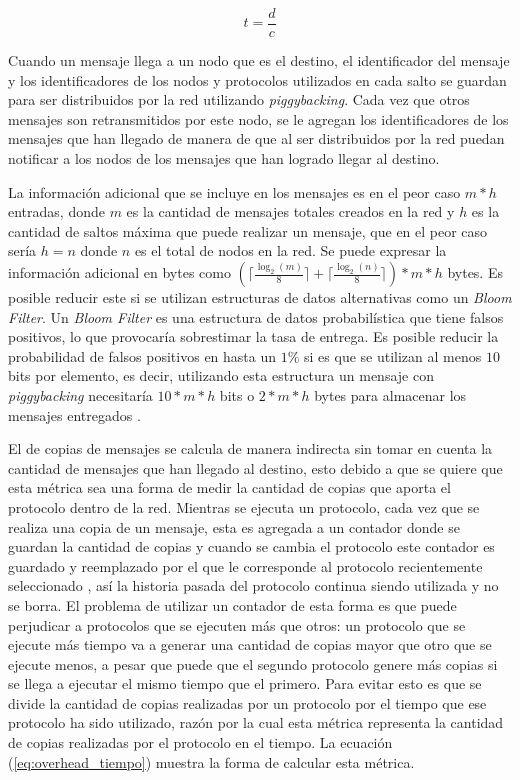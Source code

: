 \begin{equation}
    \label{eq:delivery-dinamico}
    t = \frac{d}{c}
\end{equation}

Cuando un mensaje llega a un nodo que es el destino, el identificador del
mensaje y los identificadores de los nodos y protocolos utilizados en cada salto
se guardan para ser distribuidos por la red utilizando
\textit{piggybacking}. Cada vez que otros mensajes son retransmitidos por este
nodo, se le agregan los identificadores de los mensajes que han llegado de
manera de que al ser distribuidos por la red puedan notificar a los nodos de los
mensajes que han logrado llegar al destino.

La información adicional que se incluye en los mensajes es en el peor caso $m*h$
entradas, donde $m$ es la cantidad de mensajes totales creados en la red y $h$
es la cantidad de saltos máxima que puede realizar un mensaje, que en el peor
caso sería $h = n$ donde $n$ es el total de nodos en la red. Se puede expresar
la información adicional en bytes como $(\lceil \frac{\log_2(m)}{8} \rceil +
\lceil \frac{\log_2(n)}{8} \rceil) * m * h$ bytes. Es posible reducir este
\overhead{} si se utilizan estructuras de datos alternativas como un
\textit{Bloom Filter}. Un \textit{Bloom Filter} es una estructura de datos
probabilística que tiene falsos positivos, lo que provocaría sobrestimar la tasa
de entrega. Es posible reducir la probabilidad de falsos positivos en hasta un
$1\%$ si es que se utilizan al menos $10$ bits por elemento, es decir, utilizando
esta estructura un mensaje con \textit{piggybacking} necesitaría $10*m*h$ bits o
$2*m*h$ bytes para almacenar los mensajes entregados
\cite{DBLP:conf/esa/BonomiMPSV06}.




El \overhead{} de copias de mensajes se calcula de manera indirecta sin tomar en
cuenta la cantidad de mensajes que han llegado al destino, esto debido a que se
quiere que esta métrica sea una forma de medir la cantidad de copias que aporta
el protocolo dentro de la red. Mientras se ejecuta un protocolo, cada vez que se
realiza una copia de un mensaje, esta es agregada a un contador donde se guardan
la cantidad de copias y cuando se cambia el protocolo este contador es guardado
y reemplazado por el que le corresponde al protocolo recientemente seleccionado
, así la historia pasada del protocolo continua siendo utilizada y no se borra.
El problema de utilizar un contador de esta forma es que puede perjudicar a
protocolos que se ejecuten más que otros: un protocolo que se ejecute más
tiempo va a generar una cantidad de copias mayor que otro que se ejecute menos,
a pesar que puede que el segundo protocolo genere más copias si se llega a
ejecutar el mismo tiempo que el primero. Para evitar esto es que se divide la
cantidad de copias realizadas por un protocolo por el tiempo que ese protocolo
ha sido utilizado, razón por la cual esta métrica representa la cantidad de
copias realizadas por el protocolo en el tiempo. La ecuación
(\ref{eq:overhead_tiempo}) muestra la forma de calcular esta métrica.

